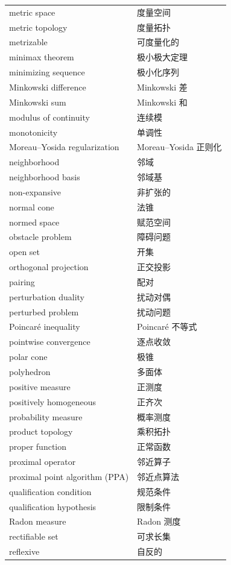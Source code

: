\begin{longtable}{ll}
metric space & 度量空间 \\
metric topology & 度量拓扑 \\
metrizable & 可度量化的 \\
minimax theorem & 极小极大定理 \\
minimizing sequence & 极小化序列 \\
Minkowski difference & Minkowski 差 \\
Minkowski sum & Minkowski 和 \\
modulus of continuity & 连续模 \\
monotonicity & 单调性 \\
Moreau--Yosida regularization & Moreau--Yosida 正则化 \\
neighborhood & 邻域 \\
neighborhood basis & 邻域基 \\
non-expansive & 非扩张的 \\
normal cone & 法锥 \\
normed space & 赋范空间 \\
obstacle problem & 障碍问题 \\
open set & 开集 \\
orthogonal projection & 正交投影 \\
pairing & 配对 \\
perturbation duality & 扰动对偶 \\
perturbed problem & 扰动问题 \\
Poincaré inequality & Poincaré 不等式 \\
pointwise convergence & 逐点收敛 \\
polar cone & 极锥 \\
polyhedron & 多面体 \\
positive measure & 正测度 \\
positively homogeneous & 正齐次 \\
probability measure & 概率测度 \\
product topology & 乘积拓扑 \\
proper function & 正常函数 \\
proximal operator & 邻近算子 \\
proximal point algorithm (PPA) & 邻近点算法 \\
qualification condition & 规范条件 \\
qualification hypothesis & 限制条件 \\
Radon measure & Radon 测度 \\
rectifiable set & 可求长集 \\
reflexive & 自反的 \\

\end{longtable}
